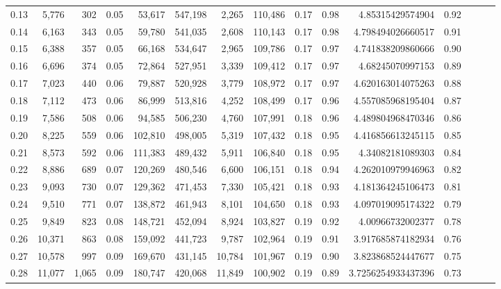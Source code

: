 \begin{tabular}{rrrrrrrrrrrrrrr}
0.13 &   5,776 &    302 &  0.05 &   53,617 &  547,198 &    2,265 &  110,486 &  0.17 &  0.98 &      4.85315429574904 &      0.92 \\
0.14 &   6,163 &    343 &  0.05 &   59,780 &  541,035 &    2,608 &  110,143 &  0.17 &  0.98 &     4.798494026660517 &      0.91 \\
0.15 &   6,388 &    357 &  0.05 &   66,168 &  534,647 &    2,965 &  109,786 &  0.17 &  0.97 &     4.741838209860666 &      0.90 \\
0.16 &   6,696 &    374 &  0.05 &   72,864 &  527,951 &    3,339 &  109,412 &  0.17 &  0.97 &      4.68245070997153 &      0.89 \\
0.17 &   7,023 &    440 &  0.06 &   79,887 &  520,928 &    3,779 &  108,972 &  0.17 &  0.97 &     4.620163014075263 &      0.88 \\
0.18 &   7,112 &    473 &  0.06 &   86,999 &  513,816 &    4,252 &  108,499 &  0.17 &  0.96 &     4.557085968195404 &      0.87 \\
0.19 &   7,586 &    508 &  0.06 &   94,585 &  506,230 &    4,760 &  107,991 &  0.18 &  0.96 &     4.489804968470346 &      0.86 \\
0.20 &   8,225 &    559 &  0.06 &  102,810 &  498,005 &    5,319 &  107,432 &  0.18 &  0.95 &     4.416856613245115 &      0.85 \\
0.21 &   8,573 &    592 &  0.06 &  111,383 &  489,432 &    5,911 &  106,840 &  0.18 &  0.95 &      4.34082181089303 &      0.84 \\
0.22 &   8,886 &    689 &  0.07 &  120,269 &  480,546 &    6,600 &  106,151 &  0.18 &  0.94 &     4.262010979946963 &      0.82 \\
0.23 &   9,093 &    730 &  0.07 &  129,362 &  471,453 &    7,330 &  105,421 &  0.18 &  0.93 &     4.181364245106473 &      0.81 \\
0.24 &   9,510 &    771 &  0.07 &  138,872 &  461,943 &    8,101 &  104,650 &  0.18 &  0.93 &     4.097019095174322 &      0.79 \\
0.25 &   9,849 &    823 &  0.08 &  148,721 &  452,094 &    8,924 &  103,827 &  0.19 &  0.92 &      4.00966732002377 &      0.78 \\
0.26 &  10,371 &    863 &  0.08 &  159,092 &  441,723 &    9,787 &  102,964 &  0.19 &  0.91 &     3.917685874182934 &      0.76 \\
0.27 &  10,578 &    997 &  0.09 &  169,670 &  431,145 &   10,784 &  101,967 &  0.19 &  0.90 &     3.823868524447677 &      0.75 \\
0.28 &  11,077 &  1,065 &  0.09 &  180,747 &  420,068 &   11,849 &  100,902 &  0.19 &  0.89 &    3.7256254933437396 &      0.73 \\

\end{tabular}
